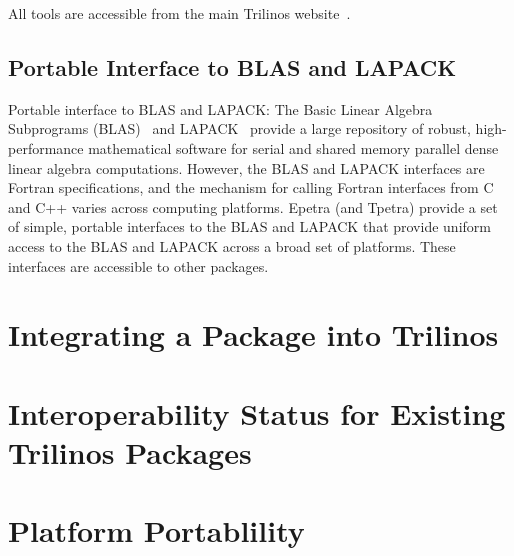 \documentclass[12pt,relax]{SANDreport}
\begin{document}
All 
tools are accessible from the main Trilinos website~\cite{Trilinos-home-page}.


	\subsection{Portable Interface to BLAS and LAPACK}

Portable interface to BLAS and LAPACK: The Basic Linear Algebra
Subprograms (BLAS)~\cite{BLAS1,BLAS2,BLAS3} and LAPACK~\cite{lapack}
provide a large repository of robust, high-performance mathematical
software for serial and shared memory parallel dense linear algebra
computations.  However, the BLAS and LAPACK interfaces are Fortran
specifications, and the mechanism for calling Fortran interfaces from
C and C++ varies across computing platforms.  Epetra (and Tpetra)
provide a set of simple, portable interfaces to the BLAS and LAPACK
that provide uniform access to the BLAS and LAPACK across a broad
set of platforms.  These interfaces are accessible to
other packages.


	\section{Integrating a Package into Trilinos}
	
	\section{Interoperability Status for Existing Trilinos Packages}

	\section{Platform Portablility}
    \clearpage
    
    

\end{document}
